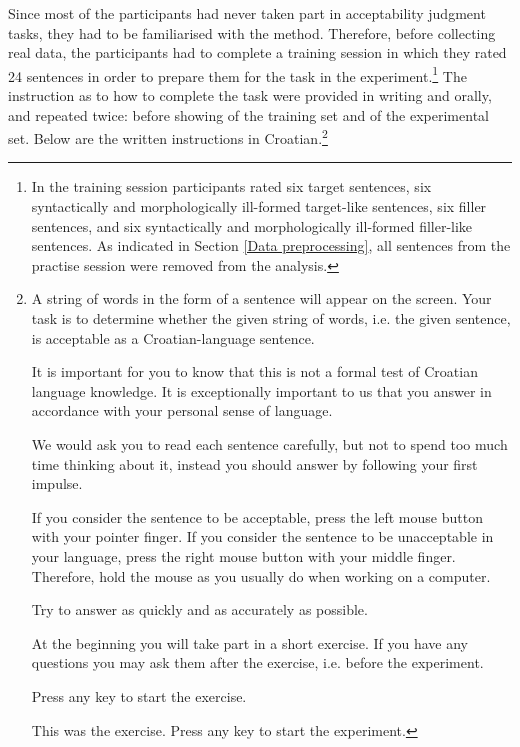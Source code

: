 Since most of the participants had never taken part in acceptability judgment tasks, they had to be familiarised with the method. Therefore, before collecting real data, the participants had to complete a training session in which they rated 24 sentences in order to prepare them for the task in the experiment.\footnote{In the training session participants rated six target sentences, six syntactically and morphologically ill-formed target-like sentences, six filler sentences, and six syntactically and morphologically ill-formed filler-like sentences. As indicated in Section \ref{Data preprocessing}, all sentences from the practise session were removed from the analysis.} The instruction as to how to complete the task were provided in writing and orally, and repeated twice: before showing of the training set and of the experimental set. Below are the written instructions in Croatian.\footnote{A string of words in the form of a sentence will appear on the screen. Your task is to determine whether the given string of words, i.e. the given sentence, is acceptable as a Croatian-language sentence. 

It is important for you to know that this is not a formal test of Croatian language knowledge. It is exceptionally important to us that you answer in accordance with your personal sense of language.

We would ask you to read each sentence carefully, but not to spend too much time thinking about it, instead you should answer by following your first impulse.

If you consider the sentence to be acceptable, press the left mouse button with your pointer finger. If you consider the sentence to be unacceptable in your language, press the right mouse button with your middle finger. Therefore, hold the mouse as you usually do when working on a computer.

Try to answer as quickly and as accurately as possible.

At the beginning you will take part in a short exercise. If you have any questions you may ask them after the exercise, i.e. before the experiment.

Press any key to start the exercise.

\center{*******}

This was the exercise. Press any key to start the experiment.
}


